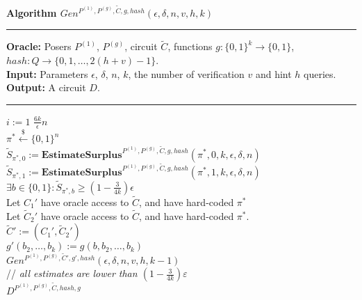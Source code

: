 %
%
\begin{codeblock}
  \textbf{Algorithm $Gen^{P^{(1)}, P^{(g)}, \widetilde{C}, g, hash}(\epsilon, \delta, n, v, h, k)$}
  \medskip
  \hrule
  \medskip
  \textbf{Oracle:} Posers $P^{(1)}$, $P^{(g)}$, circuit $\widetilde{C}$, functions $g: \{0,1\}^{k} \rightarrow \{0,1\}$, \\
  \IndII  $hash:Q \rightarrow \{0,1, \dots, 2(h + v) - 1\}$. \\
  \textbf{Input:}  Parameters $\epsilon$, $\delta$, $n$, $k$, the number of verification $v$ and hint $h$ queries.\\
  \textbf{Output:} A circuit $D$.
  \medskip\hrule\medskip
  \For $i:=1$ \To $\frac{6k}{\epsilon}n$ \Do \\
  \IndI $\pi^* \xleftarrow{\$} \{0,1\}^{n}$\\
  \IndI $\widetilde{S}_{\pi^*,0} := \textbf{EstimateSurplus}^{P^{(1)}, P^{(g)}, \widetilde{C}, g, hash}(\pi^*, 0, k, \epsilon, \delta,n)$\\
  \IndI $\widetilde{S}_{\pi^*,1} := \textbf{EstimateSurplus}^{P^{(1)}, P^{(g)}, \widetilde{C}, g, hash}(\pi^*, 1, k, \epsilon, \delta,n)$\\
  \IndI \If $ \exists b \in \{0,1\}: \widetilde{S}_{\pi^*,b} \geq (1 - \frac{3}{4k}) \epsilon$ \Then \\
  \IndII Let $C_1'$ have oracle access to $\widetilde{C}$, and have hard-coded $\pi^*$ \\
  \IndII Let $\widetilde{C}_2'$ have oracle access to $\widetilde{C}$, and have hard-coded $\pi^*$. \\
  \IndII $\widetilde{C}' := (C_1', \widetilde{C}_2')$ \\
  \IndII $g'(b_2, \dots, b_k) := g(b, b_2, \dots, b_k)$\\
  \IndII\Return $Gen^{P^{(1)},P^{(g)}, \widetilde{C}', g', hash}(\epsilon, \delta, n, v, h, k-1)$ \\
  // \textit{all estimates are lower than $(1-\frac{3}{4k})\varepsilon$}\\
  \Return $D^{P^{(1)},P^{(g)}, \widetilde{C}, hash, g}$
\end{codeblock}

